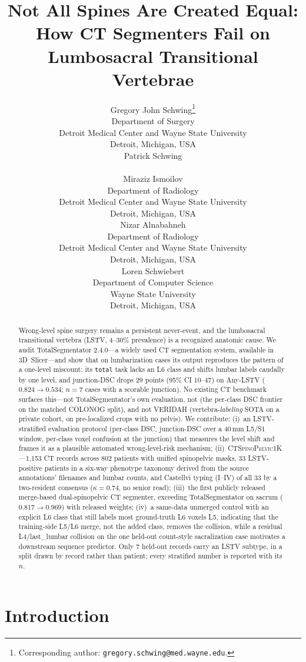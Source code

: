 \documentclass{article}
\title{Not All Spines Are Created Equal:\\
How CT Segmenters Fail on Lumbosacral Transitional Vertebrae}
\author{%
  Gregory John Schwing\thanks{Corresponding author:
    \texttt{gregory.schwing@med.wayne.edu}.} \\
  Department of Surgery \\
  Detroit Medical Center and Wayne State University \\
  Detroit, Michigan, USA \\
  \And
  Patrick Schwing \\
  \PatrickAffil{} \\
  \And
  Miraziz Ismoilov \\
  Department of Radiology \\
  Detroit Medical Center and Wayne State University \\
  Detroit, Michigan, USA \\
  \AND
  Nizar Alnabahneh \\
  Department of Radiology \\
  Detroit Medical Center and Wayne State University \\
  Detroit, Michigan, USA \\
  \And
  Loren Schwiebert \\
  Department of Computer Science \\
  Wayne State University \\
  Detroit, Michigan, USA \\
}
\newcommand{\dataset}{\textsc{CTSpinoPelvic1K}}
\newcommand{\TS}{TotalSegmentator}
\newcommand{\VERIDAH}{VERIDAH}
\begin{document}
\maketitle

\begin{abstract}
Wrong-level spine surgery remains a persistent
never-event, and the lumbosacral transitional vertebra
(LSTV, 4--30\% prevalence) is a recognized anatomic
cause. We audit \TS{} 2.4.0---a widely used CT segmentation
system, available in 3D~Slicer---and show that on
lumbarization cases its
output reproduces the pattern of a one-level miscount:
its \texttt{total} task lacks an L6 class and shifts lumbar labels caudally by
one level, and junction-DSC drops 29 points (95\% CI
10--47) on Any-LSTV
($0.824 \to 0.534$; $n{=}7$ cases with a scorable
junction). No existing CT benchmark surfaces this---not
\TS{}'s own evaluation, not \citet{Li2025LumbarMechanism}
(the per-class DSC frontier on the matched COLONOG split),
and not \VERIDAH{} (vertebra-\emph{labeling} SOTA on a
private cohort, on pre-localized crops with no pelvis).
We contribute: (i)~an LSTV-stratified evaluation protocol
(per-class DSC, junction-DSC over a 40\,mm L5/S1 window,
per-class voxel confusion at the junction) that measures
the level shift and frames it as a plausible automated
wrong-level-risk mechanism; (ii)~\dataset{}---1{,}153 CT
records across 802 patients with unified spinopelvic
masks, 33 LSTV-positive patients in a six-way phenotype
taxonomy derived from the source annotations' filenames
and lumbar counts, and Castellvi typing (I--IV) of all 33
by a two-resident consensus ($\kappa{=}0.74$, no senior read);
(iii)~the first publicly released merge-based
dual-spinopelvic CT segmenter, exceeding \TS{} on sacrum
($0.817 \to 0.969$) with released weights; (iv)~a
same-data unmerged control with an explicit L6
class that still labels most ground-truth L6 voxels L5,
indicating that the training-side L5/L6 merge, not the
added class, removes the collision, while a residual
L4/last\_lumbar collision on the one held-out count-style
sacralization case motivates a downstream sequence
predictor. Only 7
held-out records carry an LSTV subtype, in a split drawn
by record rather than patient; every stratified number
is reported with its $n$.
\end{abstract}

\section{Introduction}
\label{sec:intro}
\end{document}
